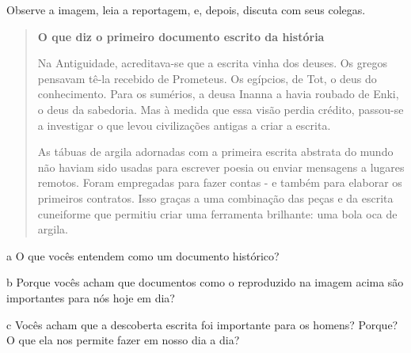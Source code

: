 Observe a imagem, leia a reportagem, e, depois, discuta com seus colegas.



\begin{quote}
\textbf{O que diz o primeiro documento escrito da história}

Na Antiguidade, acreditava-se que a escrita vinha dos deuses. Os gregos
pensavam tê-la recebido de Prometeus. Os egípcios, de Tot, o deus do
conhecimento. Para os sumérios, a deusa Inanna a havia roubado de Enki,
o deus da sabedoria. Mas à medida que essa visão perdia crédito,
passou-se a investigar o que levou civilizações antigas a criar a
escrita.

As tábuas de argila adornadas com a primeira escrita abstrata do mundo
não haviam sido usadas para escrever poesia ou enviar mensagens a
lugares remotos. Foram empregadas para fazer contas - e também para
elaborar os primeiros contratos. Isso graças a uma combinação das peças
e da escrita cuneiforme que permitiu criar uma ferramenta brilhante: uma
bola oca de argila.

\end{quote}

\num{a} O que vocês entendem como um documento histórico?


\num{b} Porque vocês acham que documentos como o reproduzido na imagem acima são
importantes para nós hoje em dia?


\num{c} Vocês acham que a descoberta escrita foi importante para os homens?
Porque? O que ela nos permite fazer em nosso dia a dia?


